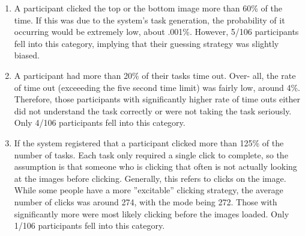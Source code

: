 \begin{enumerate}
\item{A participant clicked the top or the bottom image more than 60\% of the time. If this was due to the system’s task generation, the probability of it occurring would be extremely low, about .001\%. However, 5/106 participants fell into this category, implying that their guessing strategy was slightly biased.}

\item{A participant had more than 20\% of their tasks time out. Over-
all, the rate of time out (exceeeding the five second time limit) was fairly low, around 4\%. Therefore, those participants with significantly higher rate of time outs either did not understand the task correctly or were not taking the task seriously. Only 4/106 participants fell into this category.}

\item{If the system registered that a participant clicked more than 125\% of the number of tasks. Each task only required a single click to complete, so the assumption is that someone who is clicking that often is not actually looking at the images before clicking. Generally, this refers to clicks on the image. While some people have a more ”excitable” clicking strategy, the average number of clicks was around 274, with the mode being 272. Those with significantly more were most likely clicking before the images loaded. Only 1/106 participants fell into this category.}
\end{enumerate}

